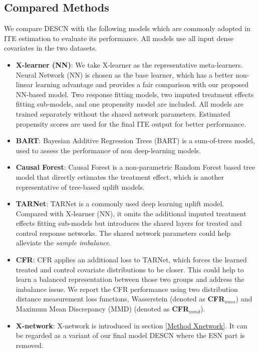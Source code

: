 \documentclass[sigconf]{acmart}
\begin{document}
\subsection{Compared Methods}
We compare DESCN with the following models which are commonly adopted in ITE estimation to evaluate its performance. All models use all input dense covariates in the two datasets.
\begin{itemize}
	\item \textbf{X-learner (NN)}\cite{Kunzel2019}: We take X-learner as the representative meta-learners. Neural Network (NN) is chosen as the base learner, which has a better non-linear learning advantage and provides a fair comparison with our proposed NN-based model. Two response fitting models, two imputed treatment effects fitting sub-models, and one propensity model are included. All models are trained separately without the shared network parameters. Estimated propensity scores are used for the final ITE output for better performance.
	\item \textbf{BART}\cite{Chipman2010}: Bayesian Additive Regression Trees (BART) is a sum-of-trees model, used to assess the performance of non deep-learning models.
	\item \textbf{Causal Forest}\cite{Wager2018}: Causal Forest is a non-parametric Random Forest based tree model that directly estimates the treatment effect, which is another representative of tree-based uplift models.
	\item \textbf{TARNet}\cite{Shalit2017}: TARNet is a commonly used deep learning uplift model. Compared with X-learner (NN), it omits the additional imputed treatment effects fitting sub-models but introduces the shared layers for treated and control response networks. The shared network parameters could help alleviate the \textit{sample imbalance}.
	\item \textbf{CFR}\cite{Shalit2017}: CFR applies an additional loss to TARNet, which forces the learned treated and control covariate distributions to be closer. This could help to learn a balanced representation between those two groups and address the imbalance issue. We report the CFR performance using two distribution distance measurement loss functions, Wasserstein \cite{villani2008optimal,cuturi2014fast} (denoted as \textbf{CFR$_{wass}$}) and Maximum Mean Discrepancy (MMD) \cite{gretton2012mmd} (denoted as \textbf{CFR$_{mmd}$}).
	\item \textbf{X-network}: X-network is introduced in section \ref{Method Xnetwork}. It can be regarded as a variant of our final model DESCN where the ESN part is removed.
\end{itemize}
\end{document}
